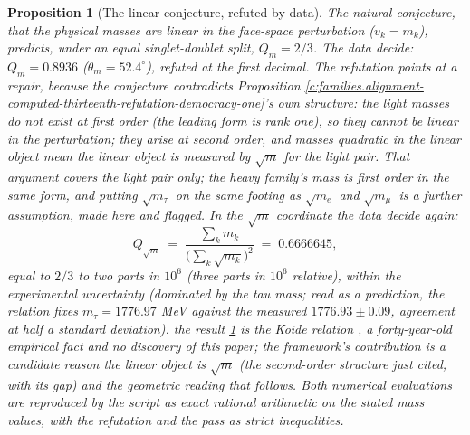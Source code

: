 \documentclass[11pt]{article}
\newtheorem{proposition}[theorem]{Proposition}
\theoremstyle{definition}
\theoremstyle{plain}
\newcommand{\changedmark}[2]{\marginpar{\raggedright\scriptsize\color{#1}#2}}
\begin{document}
\begin{proposition}[The linear conjecture, refuted by data]\label{c:families.linear-conjecture-refuted-data}
\changedmark{BrickRed}{corrected since the deposit}
The natural conjecture, that the physical masses are linear in the face-space perturbation ($v_{k} = m_{k}$), predicts, under an equal singlet-doublet split, $Q_{m} = 2/3$. The data decide: $Q_{m} = 0.8936$ ($\theta_{m} = 52.4^{\circ}$), refuted at the first decimal. The refutation points at a repair, because the conjecture contradicts Proposition \ref{c:families.alignment-computed-thirteenth-refutation-democracy-one}'s own structure: the light masses do not exist at first order (the leading form is rank one), so they cannot be linear in the perturbation; they arise at second order, and masses quadratic in the linear object mean the linear object is measured by $\sqrt{m}$ for the light pair. That argument covers the light pair only; the heavy family's mass is first order in the same form, and putting $\sqrt{m_{\tau}}$ on the same footing as $\sqrt{m_{e}}$ and $\sqrt{m_{\mu}}$ is a further assumption, made here and flagged. In the $\sqrt{m}$ coordinate the data decide again:
\begin{equation}
Q_{\sqrt{m}} \;=\; \frac{\sum_{k} m_{k}}{\bigl(\sum_{k}\sqrt{m_{k}}\bigr)^{2}} \;=\; 0.6666645,
\end{equation}
equal to $2/3$ to two parts in $10^{6}$ (three parts in $10^{6}$ relative), within the experimental uncertainty (dominated by the tau mass; read as a prediction, the relation fixes $m_{\tau} = 1776.97$ MeV against the measured $1776.93 \pm 0.09$, agreement at half a standard deviation). the result \ref{c:families.linear-conjecture-refuted-data} is the Koide relation \cite{Koide1982}, a forty-year-old empirical fact and no discovery of this paper; the framework's contribution is a candidate reason the linear object is $\sqrt{m}$ (the second-order structure just cited, with its gap) and the geometric reading that follows. Both numerical evaluations are reproduced by the script as exact rational arithmetic on the stated mass values, with the refutation and the pass as strict inequalities.
\end{proposition}
\end{document}
